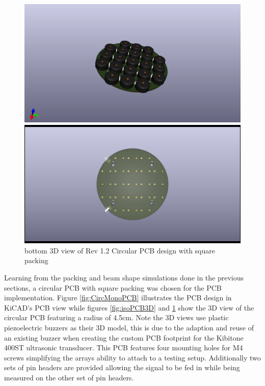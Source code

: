 \begin{figure}[ht!]
\centering

    \begin{minipage}{0.49\textwidth}
    \centering
    \includegraphics[width= \textwidth]{Figures/Design/PCB/Circular_Usonic_PCB_iso_3D.png}
    \caption{Isometric 3D view of Rev 1.2 Circular PCB design with square packing}
    \label{fig:isoPCB3D}
    \end{minipage}\hfill
    \begin{minipage}{0.49\textwidth}
    \centering
    \includegraphics[width= \textwidth]{Figures/Design/PCB/Circular_Usonic_PCB_bot.png}
    \caption{bottom 3D view of Rev 1.2 Circular PCB design with square packing}
    \label{fig:botPCB3D}
    \end{minipage}
    
\end{figure}
\newpage
Learning from the packing and beam shape simulations done in the previous sections, a circular PCB with square packing was chosen for the PCB implementation. Figure \ref{fig:CircMonoPCB} illustrates the PCB design in KiCAD's PCB view while figures \ref{fig:isoPCB3D} and \ref{fig:botPCB3D} show the 3D view of the circular PCB featuring a radius of 4.5cm. Note the 3D views use plastic piezoelectric buzzers as their 3D model, this is due to the adaption and reuse of an existing buzzer when creating the custom PCB footprint for the Kibitone 400ST ultrasonic transducer. This PCB features four mounting holes for M4 screws simplifying the arrays ability to attach to a testing setup. Additionally two sets of pin headers are provided allowing the signal to be fed in while being measured on the other set of pin headers. 

